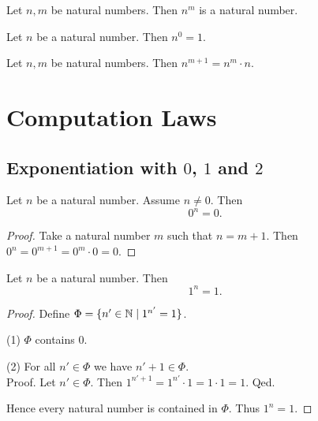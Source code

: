 \documentclass[10pt]{article}
\begin{document}
  \begin{forthel}
    \begin{lemma}
      Let $n, m$ be natural numbers.
      Then $n^{m}$ is a natural number.
    \end{lemma}
  \end{forthel}

  \begin{forthel}
    \begin{lemma}
      Let $n$ be a natural number.
      Then $n^{0} = 1$.
    \end{lemma}
  \end{forthel}

  \begin{forthel}
    \begin{lemma}
      Let $n, m$ be natural numbers.
      Then $n^{m + 1} = n^{m} \cdot n$.
    \end{lemma}
  \end{forthel}


  \section{Computation Laws}

  \subsection{Exponentiation with $0$, $1$ and $2$}

  \begin{forthel}
    \begin{proposition}
      Let $n$ be a natural number.
      Assume $n \neq 0$.
      Then \[ 0^{n} = 0. \]
    \end{proposition}
    \begin{proof}
      Take a natural number $m$ such that $n = m + 1$.
      Then $0^{n}
        = 0^{m + 1}
        = 0^{m} \cdot 0
        = 0$.
    \end{proof}
  \end{forthel}

  \begin{forthel}
    \begin{proposition}
      Let $n$ be a natural number.
      Then \[ 1^{n} = 1. \]
    \end{proposition}
    \begin{proof}
      Define $\Phi = \{ n' \in \mathbb{N} \mid 1^{n'} = 1 \}$.

      (1) $\Phi$ contains $0$.

      (2) For all $n' \in \Phi$ we have $n' + 1 \in \Phi$. \\
      Proof.
        Let $n' \in \Phi$.
        Then $1^{n' + 1}
          = 1^{n'} \cdot 1
          = 1 \cdot 1
          = 1$.
      Qed.

      Hence every natural number is contained in $\Phi$.
      Thus $1^{n} = 1$.
    \end{proof}
  \end{forthel}
\end{document}
